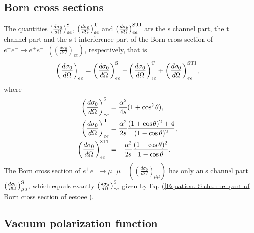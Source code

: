 \documentclass[a4paper,10pt,twoside]{cpc-hepnp}
\newcommand{\eetoee}{$e^+e^- \to e^+e^-$~}
\newcommand{\eetomumu}{$e^+e^- \to \mu^+\mu^-$~}
\begin{document}
\begin{CJK*}{UTF8}{gbsn}
\begin{multicols}{2}
\subsection{Born cross sections}

The quantities $\left(\frac{d\sigma_0}{d\Omega}\right)_{ee}^{\rm S}$, $\left(\frac{d\sigma_0}{d\Omega}\right)_{ee}^{\rm T}$ and $\left(\frac{d\sigma_0}{d\Omega}\right)_{ee}^{\rm STI}$ are the s channel part, the t channel part and the s-t interference part of the Born cross section of \eetoee $\left(\left(\frac{d\sigma_0}{d\Omega}\right)_{ee}\right)$, respectively, that is
\begin{align}
	& \ \ \  \left(\frac{d\sigma_0}{d\Omega}\right)_{ee} = \left(\frac{d\sigma_0}{d\Omega}\right)_{ee}^{\rm S} + \left(\frac{d\sigma_0}{d\Omega}\right)_{ee}^{\rm T} + \left(\frac{d\sigma_0}{d\Omega}\right)_{ee}^{\rm STI},
\end{align}
where
\begin{subequations}
	\label{Align: Born cross section of eetoee}
	\begin{align}
		\left(\frac{d\sigma_0}{d\Omega}\right)_{ee}^{\rm S} & = \frac{\alpha^2}{4s} (1+\cos^2\theta), \label{Equation: S channel part of Born cross section of eetoee} \\
		\left(\frac{d\sigma_0}{d\Omega}\right)_{ee}^{\rm T} & = \frac{\alpha^2}{2s} \frac{(1+\cos\theta)^2+4}{(1-\cos\theta)^2}, \label{Equation: T channel part of Born cross section of eetoee} \\
		\left(\frac{d\sigma_0}{d\Omega}\right)_{ee}^{\rm STI} & = - \frac{\alpha^2}{2s} \frac{(1+\cos\theta)^2}{1-\cos\theta}. \label{Equation: S-T interference part of Born cross section of eetoee}
	\end{align}
\end{subequations}
The Born cross section of \eetomumu $\left(\left(\frac{d\sigma_0}{d\Omega}\right)_{\mu\mu}\right)$ has only an s channel part $\left(\frac{d\sigma_0}{d\Omega}\right)_{\mu\mu}^{\rm S}$, which equals exactly $\left(\frac{d\sigma_0}{d\Omega}\right)_{ee}^{\rm S}$ given by Eq. (\ref{Equation: S channel part of Born cross section of eetoee}).

\subsection{Vacuum polarization function}


\end{multicols}
\end{CJK*}
\end{document}
